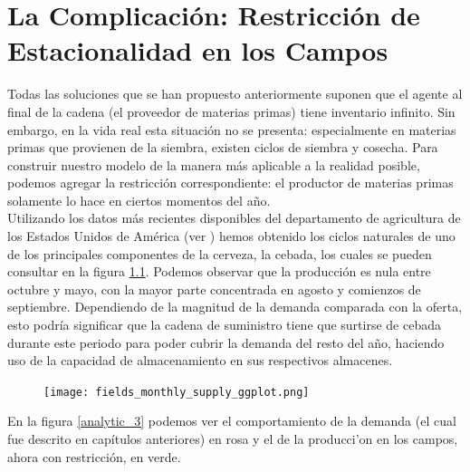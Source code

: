 \chapter{La Complicaci\'on: Restricci\'on de Estacionalidad en los Campos}

Todas las soluciones que se han propuesto anteriormente suponen que el agente al final de la cadena (el proveedor de materias primas) tiene inventario infinito. Sin embargo, en la vida real esta situaci\'on no se presenta: especialmente en materias primas que provienen de la siembra, existen ciclos de siembra y cosecha. Para construir nuestro modelo de la manera m\'as aplicable a la realidad posible, podemos agregar la restricci\'on correspondiente: el productor de materias primas solamente lo hace en ciertos momentos del a\~no.\\

Utilizando los datos m\'as recientes disponibles del departamento de agricultura de los Estados Unidos de Am\'erica (ver \citet{USDA}) hemos obtenido los ciclos naturales de uno de los principales componentes de la cerveza, la cebada, los cuales se pueden consultar en la figura \ref{fields}. Podemos observar que la producci\'on es nula entre octubre y mayo, con la mayor parte concentrada en agosto y comienzos de septiembre. Dependiendo de la magnitud de la demanda comparada con la oferta, esto podr\'ia significar que la cadena de suministro tiene que surtirse de cebada durante este periodo para poder cubrir la demanda del resto del a\~no, haciendo uso de la capacidad de almacenamiento en sus respectivos almacenes.\\

\begin{figure}[h!]
\caption{ }
\label{fields}
\texttt{[image: fields\_monthly\_supply\_ggplot.png]}
\centering
\end{figure}

En la figura \ref{analytic_3} podemos ver el comportamiento de la demanda (el cual fue descrito en cap\'itulos anteriores) en rosa y el de la producci'on en los campos, ahora con restricci\'on, en verde. \\

